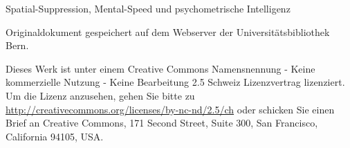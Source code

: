 \documentclass[11pt, twoside, a4paper]{book}		%
\begin{document}
\layout								%
\frontmatter						%


\begin{titlepage}

	\centering
		\huge Spatial-Suppression, Mental-Speed und psychometrische Intelligenz 
	
	\noindent\makebox[\textwidth]{\rule{\textwidth}{0.4pt}}
	
	\vspace{1.2cm}
	

		\vspace*{\fill}
		\small
	\flushleft Originaldokument gespeichert auf dem Webserver der Universitätsbibliothek Bern.

	\vspace{.2cm}
	\vspace{0cm}

	\RaggedRight Dieses Werk ist unter einem Creative Commons Namensnennung - Keine kommerzielle Nutzung - Keine Bearbeitung 2.5 Schweiz Lizenzvertrag lizenziert. Um die Lizenz anzusehen, gehen Sie bitte zu \url{http://creativecommons.org/licenses/by-nc-nd/2.5/ch} oder schicken Sie einen Brief an Creative Commons, 171 Second Street, Suite 300, San Francisco, California 94105, USA.


\end{titlepage}
\end{document}
